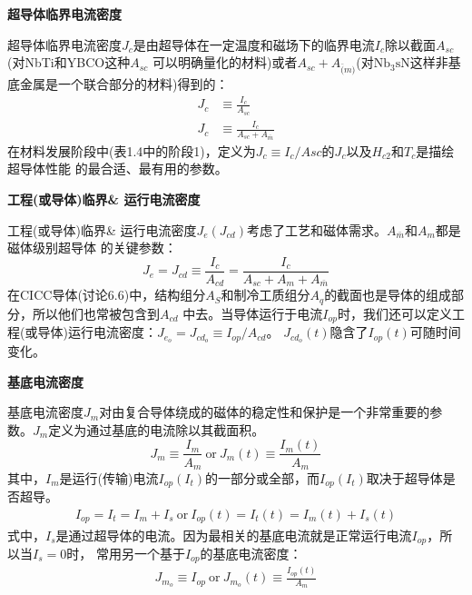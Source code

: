 \textbf{超导体临界电流密度}

超导体临界电流密度$J_c$是由超导体在一定温度和磁场下的临界电流$I_c$除以截面$A_{sc}$(对NbTi和YBCO这种$A_{sc}$
可以明确量化的材料)或者$A_{sc}+A_{\bar(m)}$(对$\mathrm{Nb_3 sN}$这样非基底金属是一个联合部分的材料)得到的：
\begin{subequations}
	\begin{align}
	J_c&\equiv\frac{I_c}{A_{sc}}\\
	J_c&\equiv\frac{I_c}{A_{sc}+A_{\bar{m}}}
	\end{align}
\end{subequations}
在材料发展阶段中(表1.4中的阶段1)，定义为$J_c\equiv I_c/A{sc}$的$J_c$以及$H_{c2}$和$T_c$是描绘超导体性能
的最合适、最有用的参数。

\textbf{工程(或导体)临界\& 运行电流密度}

工程(或导体)临界\& 运行电流密度$J_e (J_{cd})$考虑了工艺和磁体需求。$A_{\bar{m}}$和$A_m$都是磁体级别超导体
的关键参数：
\begin{equation}%
J_e=J_{cd}\equiv\frac{I_c}{A_{cd}}=\frac{I_c}{A_{sc}+A_m+A_{\bar{m}}}
\end{equation}
在CICC导体(讨论6.6)中，结构组分$A_S$和制冷工质组分$A_q$的截面也是导体的组成部分，所以他们也常被包含到$A_{cd}$
中去。当导体运行于电流$I_{op}$时，我们还可以定义工程(或导体)运行电流密度：$J_{e_o}=J_{cd_o}\equiv I_{op}/A_{cd}$。
$J_{cd_o}(t)$隐含了$I_{op}(t)$可随时间变化。

\textbf{基底电流密度}

基底电流密度$J_m$对由复合导体绕成的磁体的稳定性和保护是一个非常重要的参数。$J_m$定义为通过基底的电流除以其截面积。
\begin{equation}%
J_{m}\equiv\frac{I_m}{A_m}    \ \mbox{or}\    J_m(t)\equiv\frac{I_m(t)}{A_m}
\end{equation}
其中，$I_m$是运行(传输)电流$I_{op}(I_t)$的一部分或全部，而$I_{op}(I_t)$取决于超导体是否超导。
\begin{align*}%
I_{op}=I_t=I_m+I_s  \ \mbox{or}\ I_{op}(t)=I_{t}(t)=I_m(t)+I_s(t) \tag{6.7b}
\end{align*}
式中，$I_s$是通过超导体的电流。因为最相关的基底电流就是正常运行电流$I_{op}$，所以当$I_s=0$时，
常用另一个基于$I_{op}$的基底电流密度：
\begin{align*}%
J_{m_o}\equiv I_{op}   \ \mbox{or}\  J_{m_o}(t)\equiv\frac{I_{op}(t)}{A_m} \tag{6.7c}
\end{align*}

